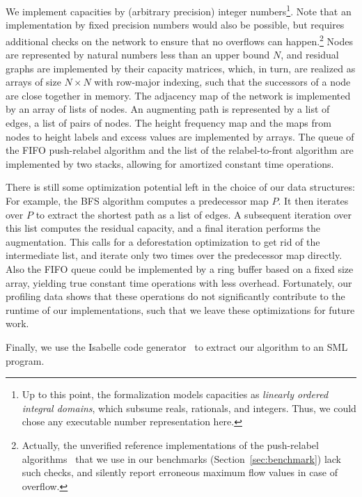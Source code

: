\documentclass[smallcondensed]{svjour3}     %
\begin{document}
  We implement capacities by (arbitrary precision) integer numbers\footnote{Up to this point, the formalization models capacities as \emph{linearly ordered integral domains}, which subsume reals, rationals, and integers. Thus, we could chose any executable number representation here.}. Note that an implementation by fixed precision numbers would also be possible,
  but requires additional checks on the network to ensure that no overflows can happen.\footnote{Actually, the unverified reference 
  implementations of the push-relabel algorithms~\cite{ChGo97,ICPC-notebook} that we use in our benchmarks (\cf Section~\ref{sec:benchmark}) lack such checks, and silently report erroneous maximum flow values in case of overflow.}
  Nodes are represented by natural numbers less than an upper bound $N$, and residual graphs are implemented by their capacity matrices, which, in turn,
  are realized as arrays of size $N\times N$ with row-major indexing, such that the successors of a node are close together in memory.
  The adjacency map of the network is implemented by an array of lists of nodes. 
  An augmenting path is represented by a list of edges, \ie a list of pairs of nodes. 
  The height frequency map and the maps from nodes to height labels and excess values are implemented by arrays.
  The queue of the FIFO push-relabel algorithm and the list of the relabel-to-front algorithm are implemented by two stacks, allowing for amortized constant time operations.

  There is still some optimization potential left in the choice of our data structures: 
  For example, the BFS algorithm computes a predecessor map $P$. It then iterates over $P$ to extract the shortest path as a list of edges.
  A subsequent iteration over this list computes the residual capacity, and a final iteration performs the augmentation. 
  This calls for a deforestation optimization to get rid of the intermediate list, and iterate only two times over the predecessor map directly.
  Also the FIFO queue could be implemented by a ring buffer based on a fixed size array, yielding true constant time operations with less overhead.
  Fortunately, our profiling data shows that these operations do not significantly contribute to the runtime of our implementations, such that 
  we leave these optimizations for future work.
  
  
  Finally, we use the Isabelle code generator~\cite{Haft09,HaNi10} to extract our algorithm to an SML program.
  
\end{document}
